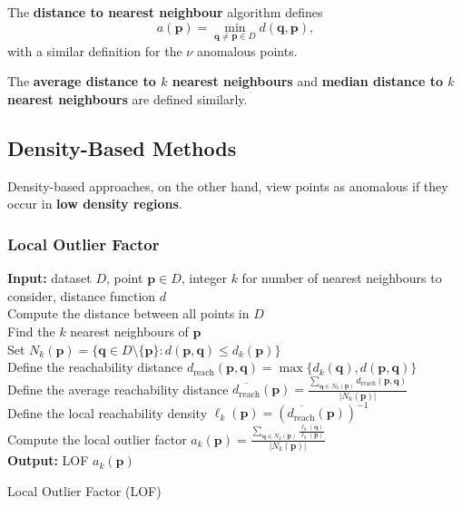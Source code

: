 The \textbf{distance to nearest neighbour} algorithm defines 
$$
a(\mathbf{p}) 
= \min_{\mathbf{q}\neq \mathbf{p} \in D} d(\mathbf{q}, \mathbf{p}),
$$
with a similar definition for the $\nu$ anomalous points. 

The \textbf{average distance to $k$ nearest neighbours} and \textbf{median distance to $k$ nearest neighbours} are defined similarly. 

\subsection{Density-Based Methods} %

Density-based approaches, on the other hand, view points as anomalous if they occur in \textbf{low density regions}.

\subsubsection*{Local Outlier Factor} %

\begin{algorithm}[ht]
\SetAlgoLined
\textbf{Input:} dataset $D$, point $\mathbf{p} \in D$, integer $k$ for number of nearest neighbours to consider, distance function $d$
\\ Compute the distance between all points in $D$
\\
Find the $k$ nearest neighbours of $\mathbf{p}$ 
\\ Set $N_k(\mathbf{p}) = \{ \mathbf{q} \in D \setminus \{\mathbf{p}\} : d(\mathbf{p}, \mathbf{q}) \leq d_k(\mathbf{p}) \}$
\\ Define the reachability distance
$d_{\text{reach}}(\mathbf{p},\mathbf{q}) = \max\{d_k(\mathbf{q}), d(\mathbf{p},\mathbf{q})\}$
\\ Define the average reachability distance $\overline{d_{\text{reach}}}(\mathbf{p}) 
= \frac{\sum_{\mathbf{q} \in N_k(\mathbf{p})} d_{\text{reach}}(\mathbf{p},\mathbf{q})}{\lvert N_k(\mathbf{p}) \rvert}$
\\Define the local reachability density
$\ell_k(\mathbf{p}) = \left( \overline{d_{\text{reach}}}(\mathbf{p}) \right)^{-1}$
\\Compute the local outlier factor
$a_k(\mathbf{p})
= \frac{\sum_{\mathbf{q} \in N_k(\mathbf{p})} \frac{\ell_k(\mathbf{q})}{\ell_k(\mathbf{p})}}{\lvert N_k(\mathbf{p}) \rvert}$
\\ \textbf{Output:} LOF $a_k(\mathbf{p})$
\caption{Local Outlier Factor (LOF)}
\label{alg:LOF}
\end{algorithm}

